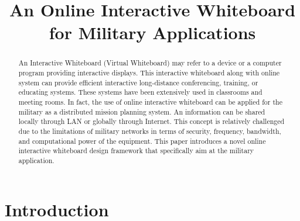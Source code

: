 \documentclass[conference]{IEEEtran}
\begin{document}
\title{An Online Interactive Whiteboard \\for Military Applications}


\author{
}









\maketitle


\begin{abstract}
An Interactive Whiteboard (Virtual Whiteboard) may refer to a device or a computer program providing interactive displays. 
This interactive whiteboard along with online system can provide efficient interactive long-distance conferencing, training, or educating systems. 
These systems have been extensively used in classrooms and meeting rooms. 
In fact, the use of online interactive whiteboard can be applied for the military as a distributed mission planning system. 
An information can be shared locally through LAN or globally through Internet. 
This concept is relatively challenged due to the limitations of military networks in terms of security, frequency, bandwidth, and computational power of the equipment. 
This paper introduces a novel online interactive whiteboard design framework that specifically aim at the military application.      
\end{abstract}

\IEEEpeerreviewmaketitle


\section{Introduction}
\end{document}
